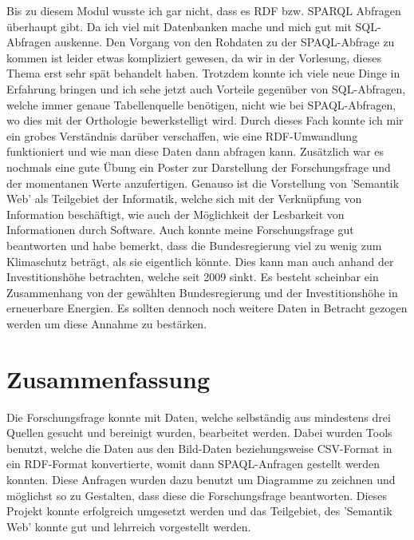 \documentclass[12pt]{article}
\begin{document}
Bis zu diesem Modul wusste ich gar nicht, dass es RDF bzw. SPARQL Abfragen überhaupt gibt. Da ich viel mit Datenbanken mache und mich gut mit SQL-Abfragen auskenne. Den Vorgang von den Rohdaten zu der SPAQL-Abfrage zu kommen ist leider etwas kompliziert gewesen, da wir in der Vorlesung, dieses Thema erst sehr spät behandelt haben. Trotzdem konnte ich viele neue Dinge in Erfahrung bringen und ich sehe jetzt auch Vorteile gegenüber von SQL-Abfragen, welche immer genaue Tabellenquelle benötigen, nicht wie bei SPAQL-Abfragen, wo dies mit der Orthologie bewerkstelligt wird. Durch dieses Fach konnte ich mir ein grobes Verständnis darüber verschaffen, wie eine RDF-Umwandlung funktioniert und wie man diese Daten dann abfragen kann. Zusätzlich war es nochmals eine gute Übung ein Poster zur Darstellung der Forschungsfrage und der momentanen Werte anzufertigen. Genauso ist die Vorstellung von 'Semantik Web' als Teilgebiet der Informatik, welche sich mit der Verknüpfung von Information beschäftigt, wie auch der Möglichkeit der Lesbarkeit von Informationen durch Software. Auch konnte meine Forschungsfrage gut beantworten und habe bemerkt, dass die Bundesregierung viel zu wenig zum Klimaschutz beträgt, als sie eigentlich könnte. Dies kann man auch anhand der Investitionshöhe betrachten, welche seit 2009 sinkt. Es besteht scheinbar ein Zusammenhang von der gewählten Bundesregierung und der Investitionshöhe in erneuerbare Energien. Es sollten dennoch noch weitere Daten in Betracht gezogen werden um diese Annahme zu bestärken. 

    \section{Zusammenfassung}

Die Forschungsfrage konnte mit Daten, welche selbständig aus mindestens drei Quellen gesucht und bereinigt wurden, bearbeitet werden. Dabei wurden Tools benutzt, welche die Daten aus den Bild-Daten beziehungsweise CSV-Format in ein RDF-Format konvertierte, womit dann SPAQL-Anfragen gestellt werden konnten. Diese Anfragen wurden dazu benutzt um Diagramme zu zeichnen und möglichst so zu Gestalten, dass diese die Forschungsfrage beantworten. Dieses Projekt konnte erfolgreich umgesetzt werden und das Teilgebiet, des 'Semantik Web' konnte gut und lehrreich vorgestellt werden.
\end{document}
